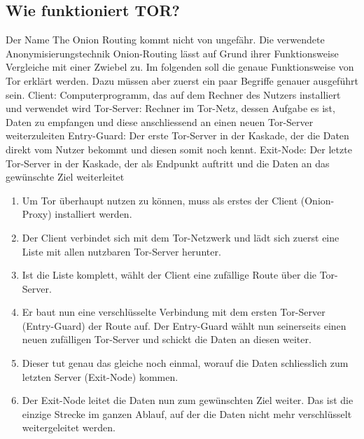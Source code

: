 \subsection{Wie funktioniert TOR?}
Der Name The Onion Routing kommt nicht von ungefähr. Die verwendete Anonymisierungstechnik Onion-Routing lässt auf Grund ihrer Funktionsweise Vergleiche mit einer Zwiebel zu. Im folgenden soll die genaue Funktionsweise von Tor erklärt werden. Dazu müssen aber zuerst ein paar Begriffe genauer ausgeführt sein.
Client: Computerprogramm, das auf dem Rechner des Nutzers installiert und verwendet wird
Tor-Server: Rechner im Tor-Netz, dessen Aufgabe es ist, Daten zu empfangen und diese anschliessend an einen neuen Tor-Server weiterzuleiten
Entry-Guard: Der erste Tor-Server in der Kaskade, der die Daten direkt vom Nutzer bekommt und diesen somit noch kennt.
Exit-Node: Der letzte Tor-Server in der Kaskade, der als Endpunkt auftritt und die Daten an das gewünschte Ziel weiterleitet

\begin{enumerate}
\item Um Tor überhaupt nutzen zu können, muss als erstes der  Client (Onion-Proxy) installiert werden.
\item Der Client verbindet sich mit dem Tor-Netzwerk und lädt sich zuerst eine Liste mit allen nutzbaren Tor-Server herunter.
\item Ist die Liste komplett, wählt der Client eine zufällige Route über die Tor-Server.
\item Er baut nun eine verschlüsselte Verbindung mit dem ersten Tor-Server (Entry-Guard) der Route auf. Der Entry-Guard wählt nun seinerseits einen neuen zufälligen Tor-Server und schickt die Daten an diesen weiter.
\item Dieser tut genau das gleiche noch einmal, worauf die Daten schliesslich zum letzten Server (Exit-Node) kommen.
\item Der Exit-Node leitet die Daten nun zum gewünschten Ziel weiter. Das ist die einzige Strecke im ganzen Ablauf, auf der die Daten nicht mehr verschlüsselt weitergeleitet werden.
\end{enumerate}

